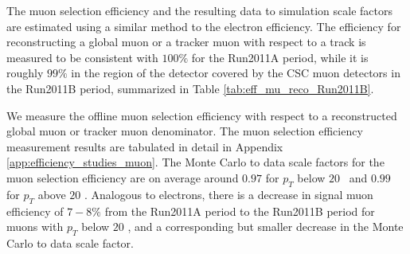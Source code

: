 
The muon selection efficiency and the resulting data to simulation
scale factors are estimated using a similar method to the electron efficiency. 
The efficiency for reconstructing a global muon or a tracker muon with respect
to a track is measured to be consistent with $100\%$ for the Run2011A period, 
while it is roughly $99\%$ in the region of the detector covered by the 
CSC muon detectors in the Run2011B period, summarized in Table 
\ref{tab:eff_mu_reco_Run2011B}.

We measure the offline muon selection efficiency with respect to a reconstructed 
global muon or tracker muon denominator. The muon selection efficiency measurement 
results are tabulated in detail in Appendix 
\ref{app:efficiency_studies_muon}. The Monte Carlo to data scale factors for the 
muon selection efficiency are on average around $0.97$ for $p_{T}$ below $20$ 
\GeV\ and $0.99$ for $p_{T}$ above $20$ \GeV.  
Analogous to electrons, there is a decrease in signal muon efficiency of $7-8\%$ from the
Run2011A period to the Run2011B period for muons with 
$p_{T}$ below $20$ \GeV, and a corresponding but smaller decrease in the 
Monte Carlo to data scale factor. 

